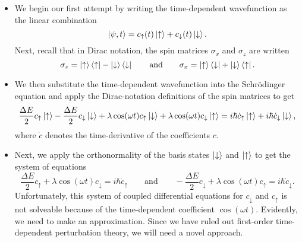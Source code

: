 \documentclass[11pt, a4paper]{article}
\newcommand{\eqtext}[1]{\qquad \text{#1} \qquad}
\newcommand{\Schro}{Schr\"{o}dinger\xspace}
\newcommand{\p}{\psi}  %
\newcommand{\ua}{\uparrow}  %
\newcommand{\da}{\downarrow}  %
\begin{document}
\begin{itemize}
	\item We begin our first attempt by writing the time-dependent wavefunction as the linear combination
	\begin{equation*}
		\ket{\p, t} = c_{\ua}(t)\ket{\ua} + c_{\da}(t)\ket{\da}.
	\end{equation*}
    Next, recall that in Dirac notation, the spin matrices $ \sigma_{x} $ and $ \sigma_{z} $ are written
	\begin{equation*}
		\sigma_{z} = \ket{\ua}\bra{\ua} - \ket{\da}\bra{\da} \eqtext{and} \sigma_{x} = \ket{\ua}\bra{\da} + \ket{\da}\bra{\ua}.
	\end{equation*}
	
    \item We then substitute the time-dependent wavefunction into the \Schro equation and apply the Dirac-notation definitions of the spin matrices to get
	\begin{equation*}
        \frac{\Delta E}{2}c_{\ua}\ket{\ua} - \frac{\Delta E}{2}c_{\da}\ket{\da} + \lambda \cos (\omega t) c_{\ua}\ket{\da} + \lambda \cos (\omega t) c_{\da}\ket{\ua} = i \hbar \dot{c}_{\ua}\ket{\ua} + i \hbar \dot{c}_{\da}\ket{\da},
	\end{equation*}
    where $ \dot{c} $ denotes the time-derivative of the coefficients $ c $.

    \item Next, we apply the orthonormality of the basis states $ \ket{\da} $ and $ \ket{\ua} $ to get the system of equations
	\begin{equation*}
        \frac{\Delta E}{2}c_{\ua} + \lambda \cos(\omega t) c_{\da} = i \hbar \dot{c}_{\ua} \eqtext{and} -\frac{\Delta E}{2}c_{\da} + \lambda \cos (\omega t) c_{\ua} = i \hbar \dot{c}_{\da}.
	\end{equation*}
    Unfortunately, this system of coupled differential equations for $ c_{\da} $ and $ c_{\ua} $ is not solveable because of the time-dependent coefficient $ \cos(\omega t) $. Evidently, we need to make an approximation. Since we have ruled out first-order time-dependent perturbation theory, we will need a novel approach.
\end{itemize}
\end{document}
